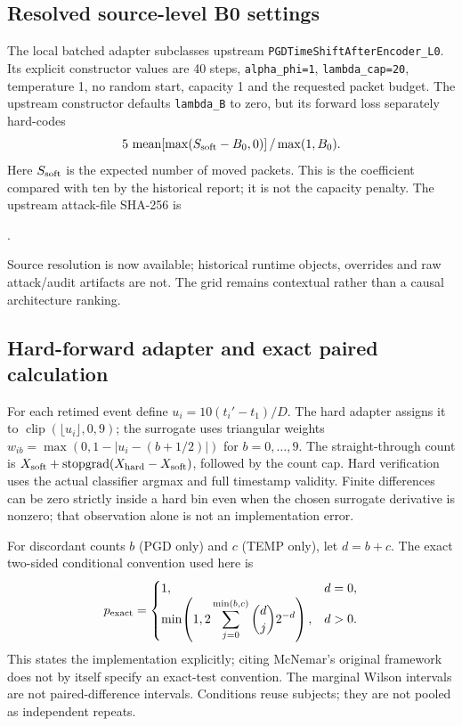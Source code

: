 \subsection{Resolved source-level B0 settings}
The local batched adapter subclasses upstream \texttt{PGDTimeShiftAfterEncoder\_L0}. Its explicit constructor values are 40 steps, \texttt{alpha\_phi=1}, \texttt{lambda\_cap=20}, temperature 1, no random start, capacity 1 and the requested packet budget. The upstream constructor defaults \texttt{lambda\_B} to zero, but its forward loss separately hard-codes
\[
 5\,\operatorname{mean}\!\left[\max(S_{\rm soft}-B_0,0)\right]/\max(1,B_0).
\]
Here $S_{\rm soft}$ is the expected number of moved packets. This is the coefficient compared with ten by the historical report; it is not the capacity penalty. The upstream attack-file SHA-256 is
\begin{center}.\end{center}
Source resolution is now available; historical runtime objects, overrides and raw attack/audit artifacts are not. The grid remains contextual rather than a causal architecture ranking.

\subsection{Hard-forward adapter and exact paired calculation}
For each retimed event define $u_i=10(t_i'-t_1)/D$. The hard adapter assigns it to $\operatorname{clip}(\lfloor u_i\rfloor,0,9)$; the surrogate uses triangular weights $w_{ib}=\max(0,1-|u_i-(b+1/2)|)$ for $b=0,\ldots,9$. The straight-through count is $X_{\rm soft}+\operatorname{stopgrad}(X_{\rm hard}-X_{\rm soft})$, followed by the count cap. Hard verification uses the actual classifier argmax and full timestamp validity. Finite differences can be zero strictly inside a hard bin even when the chosen surrogate derivative is nonzero; that observation alone is not an implementation error.

For discordant counts $b$ (PGD only) and $c$ (TEMP only), let $d=b+c$. The exact two-sided conditional convention used here is
\begin{equation}
p_{\rm exact}=\begin{cases}
1,&d=0,\\
\min\!\left(1,2\displaystyle\sum_{j=0}^{\min(b,c)}{d\choose j}2^{-d}\right),&d>0.
\end{cases}
\end{equation}
This states the implementation explicitly; citing McNemar's original framework \cite{mcnemar1947} does not by itself specify an exact-test convention. The marginal Wilson intervals \cite{wilson1927} are not paired-difference intervals. Conditions reuse subjects; they are not pooled as independent repeats.

